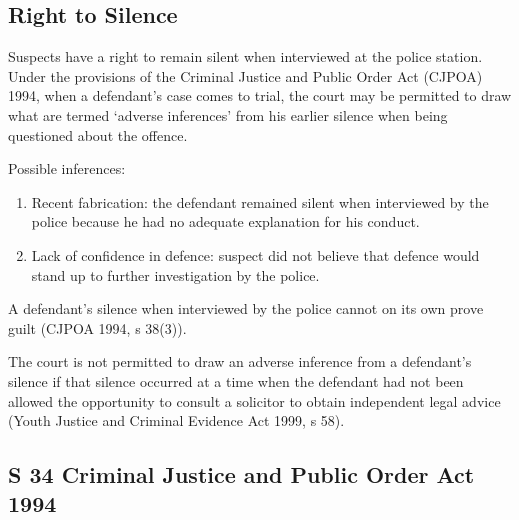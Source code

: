 \documentclass[
]{article}
\providecommand{\tightlist}{%
  \setlength{\itemsep}{0pt}\setlength{\parskip}{0pt}}
\begin{document}
\hypertarget{right-to-silence}{%
\subsection{Right to Silence}\label{right-to-silence}}

Suspects have a right to remain silent when interviewed at the police
station. Under the provisions of the Criminal Justice and Public Order
Act (CJPOA) 1994, when a defendant's case comes to trial, the court may
be permitted to draw what are termed `adverse inferences' from his
earlier silence when being questioned about the offence.

Possible inferences:

\begin{enumerate}
\def\labelenumi{\arabic{enumi}.}
\tightlist
\item
  Recent fabrication: the defendant remained silent when interviewed by
  the police because he had no adequate explanation for his conduct.
\item
  Lack of confidence in defence: suspect did not believe that defence
  would stand up to further investigation by the police.
\end{enumerate}

A defendant's silence when interviewed by the police cannot on its own
prove guilt (CJPOA 1994, s 38(3)).

The court is not permitted to draw an adverse inference from a
defendant's silence if that silence occurred at a time when the
defendant had not been allowed the opportunity to consult a solicitor to
obtain independent legal advice (Youth Justice and Criminal Evidence Act
1999, s 58).

\hypertarget{s-34-criminal-justice-and-public-order-act-1994}{%
\subsection{S 34 Criminal Justice and Public Order Act
1994}\label{s-34-criminal-justice-and-public-order-act-1994}}
\end{document}
